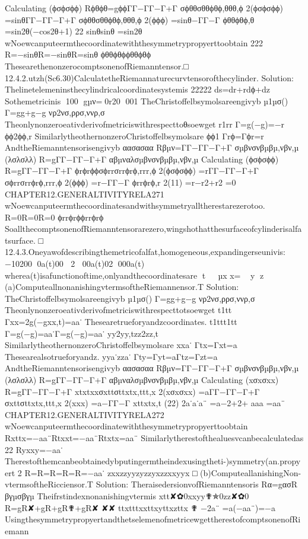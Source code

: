 {{{{{{{{{{{{{{{{Calculating
(ϕσϕσϕϕ)
Rϕθϕθ=gϕϕΓΓ−ΓΓ−Γ+Γ
σϕθθσθθϕθϕ,θθθ,ϕ
2(ϕσϕσϕϕ)
=sinθΓΓ−ΓΓ−Γ+Γ
σϕθθσθθϕθϕ,θθθ,ϕ
2(ϕϕϕ)
=sinθ−ΓΓ−Γ
ϕθθϕθϕ,θ
=sin2θ(−cos2θ+1)
22
sinθsinθ
=sin2θ
wNoewcanputeermthecoordinatewiththesymmetrypropyerttoobtain
222
R=−sinθR=−sinθR=sinθ
ϕθθϕθϕϕθθϕθϕ
ThesearethenonzerocomptsonenofRiemanntensor.□
12.4.2.utzh(Sc6.30)CalculatetheRiemannaturecurvtensorofthecylinder.
Solution:
Thelinetelemeninsthecylindricalcoordinatesystemis
22222
ds=dr+rdϕ+dz
Sothemetricinis
100
gµν=0r20
001
TheChristoffelbsymolsareengivyb
µ1µσ()
Γ=gg+g−g
νρ2νσ,ρρσ,ννρ,σ
Theonlynonzeroeativderivofmetriciswithrespecttoθsoewget
r1rr
Γ=g(−g)=−r
ϕϕ2ϕϕ,r
SimilarlytheothernonzeroChristoffelbsymolsare
ϕϕ1
Γrϕ=Γϕr=r
AndtheRiemanntensorisengivyb
αασασαα
Rβµν=ΓΓ−ΓΓ−Γ+Γ
σµβνσνβµβµ,νβν,µ
(λσλσλλ)
R=gΓΓ−ΓΓ−Γ+Γ
αβµναλσµβνσνβµβµ,νβν,µ
Calculating
(ϕσϕσϕϕ)
R=gΓΓ−ΓΓ−Γ+Γ
ϕrϕrϕϕσϕrrσrrϕrϕ,rrr,ϕ
2(ϕσϕσϕϕ)
=rΓΓ−ΓΓ−Γ+Γ
σϕrrσrrϕrϕ,rrr,ϕ
2(ϕϕϕ)
=r−ΓΓ−Γ
ϕrrϕrϕ,r
2(11)
=r−r2+r2
=0
CHAPTER12.GENERALTIVITYRELA271
wNoewcanputeermthecoordinatesandwithsymmetryalltherestarezerotoo.
R=0R=0R=0
ϕrrϕrϕϕrrϕrϕ
SoallthecomptsonenofRiemanntensorarezero,wingshothatthesurfaceofcylinderisalfatsurface.
□
12.4.3.Oneyawofdescribingthemetricofalfat,homogeneous,expandingerseunivis:

−10200
0a(t)00
2
00a(t)02
000a(t)
wherea(t)isafunctionoftime,onlyandthecoordinatesare
t

µx
x=
y
z
(a)ComputeallnonanishingvtermsoftheRiemannensor.T
Solution:
TheChristoffelbsymolsareengivyb
µ1µσ()
Γ=gg+g−g
νρ2νσ,ρρσ,ννρ,σ
Theonlynonzeroeativderivofmetriciswithrespecttotsoewget
t1tt
Γxx=2g(−gxx,t)=aa˙
Thesearetrueforyandzcoordinates.
t1ttt1tt
Γ=g(−g)=aa˙Γ=g(−g)=aa˙
yy2yy,tzz2zz,t
SimilarlytheothernonzeroChristoffelbsymolsare
xxa˙
Γtx=Γxt=a
Thesearealsotrueforyandz.
yya˙zza˙
Γty=Γyt=aΓtz=Γzt=a
AndtheRiemanntensorisengivyb
αασασαα
Rβµν=ΓΓ−ΓΓ−Γ+Γ
σµβνσνβµβµ,νβν,µ
(λσλσλλ)
R=gΓΓ−ΓΓ−Γ+Γ
αβµναλσµβνσνβµβµ,νβν,µ
Calculating
(xσxσxx)
R=gΓΓ−ΓΓ−Γ+Γ
xtxtxxσxttσttxtx,ttt,x
2(xσxσxx)
=aΓΓ−ΓΓ−Γ+Γ
σxttσttxtx,ttt,x
2(xxx)
=a−ΓΓ−Γ
xttxtx,t
(22)
2a˙a˙a¨
=a−2+2+
aaa
=aa¨
CHAPTER12.GENERALTIVITYRELA272
wNoewcanputeermthecoordinatewiththesymmetrypropyerttoobtain
Rxttx=−aa¨Rtxxt=−aa¨Rtxtx=aa¨
Similarlytherestofthealuesvcanbecalculatedas
22
Ryxxy=−aa˙
Therestofthemcanbeobtainedybputingermtheindexusingtheti-)symmetry(an.propyert
2
R=R=R=R=R=−aa˙
zxxzzyyzyzzyxzzxxyyx
□
(b)ComputeallanishingNon-vtermsoftheRicciensor.T
Solution:
TheraisedersionvofRiemanntensoris
Rα=gασR
βγµσβγµ
Theifrstindexnonanishingvtermis
xtt✘✿0xxyy✟✯0zz✘✿0
R=gR✘+gR+gR✟+gR✘
✘✘
ttxtttxxttxyttxzttx
✟
−2a¨
=a(−aa¨)=−a
UsingthesymmetrypropyertandthetselemenofmetricewgettherestofcomptsonenofRiemann
}}}}}}}}}}}}}}}}
